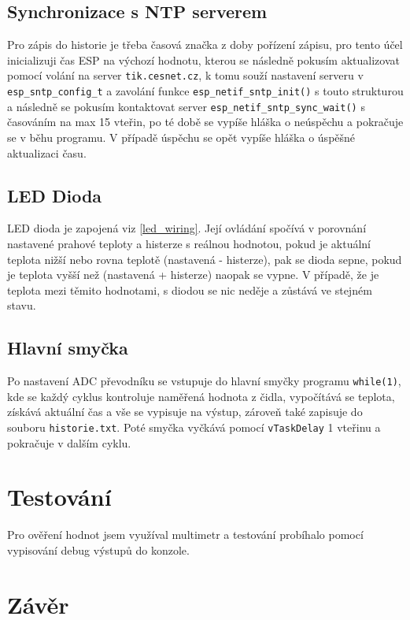 \documentclass[a4paper, 11pt]{article}
\begin{document}
\subsection{Synchronizace s NTP serverem}
Pro zápis do historie je třeba časová značka z doby pořízení zápisu, pro tento účel inicializuji čas ESP na výchozí hodnotu, kterou se následně pokusím aktualizovat pomocí volání na server \texttt{tik.cesnet.cz}, k tomu souží nastavení serveru v \texttt{esp\_sntp\_config\_t} a zavolání funkce \texttt{esp\_netif\_sntp\_init()} s touto strukturou a následně se pokusím kontaktovat server \texttt{esp\_netif\_sntp\_sync\_wait()} s časováním na max 15 vteřin, po té době se vypíše hláška o neúspěchu a pokračuje se v běhu programu. V případě úspěchu se opět vypíše hláška o úspěšné aktualizaci času.

 \subsection{LED Dioda}
 LED dioda je zapojená viz \ref{led_wiring}. Její ovládání spočívá v porovnání nastavené prahové teploty a histerze s reálnou hodnotou, pokud je  aktuální teplota nižší nebo rovna teplotě (nastavená - histerze), pak se dioda sepne, pokud je teplota vyšší než (nastavená + histerze) naopak se vypne. V případě, že je teplota mezi těmito hodnotami, s diodou se nic neděje a zůstává ve stejném stavu.

 \subsection{Hlavní smyčka}
 Po nastavení ADC převodníku se vstupuje do hlavní smyčky programu \texttt{while(1)}, kde se každý cyklus kontroluje naměřená hodnota z čidla, vypočítává se teplota, získává aktuální čas a vše se vypisuje na výstup, zároveň také zapisuje do souboru \texttt{historie.txt}. Poté smyčka vyčkává pomocí \texttt{vTaskDelay} 1 vteřinu a pokračuje v dalším cyklu.

 
    \section{Testování}
    Pro ověření hodnot jsem využíval multimetr a testování probíhalo pomocí vypisování debug výstupů do konzole. 
    
    \section{Závěr}
 
\end{document}
